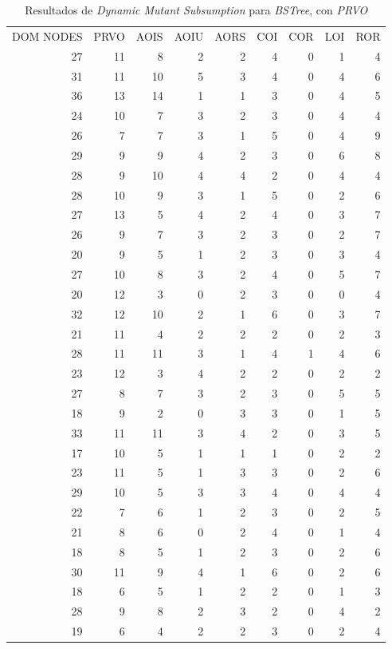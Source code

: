 \begin{table}[]
	\caption[\emph{Dynamic Mutant Subsumption} \emph{BSTree}, con \emph{PRVO}]{Resultados de \emph{Dynamic Mutant Subsumption} para \emph{BSTree}, con \emph{PRVO}}
	\label{tables.results.subsumption.bstree.prvo}
	\centering
	\scriptsize
	\def\arraystretch{0.95}
	\setlength\tabcolsep{0.5mm}
	\begin{tabular}{rrrrrrrrr}
		DOM NODES & PRVO & AOIS & AOIU & AORS & COI & COR & LOI & ROR \\
		27 & 11 & 8 & 2 & 2 & 4 & 0 & 1 & 4 \\
		31 & 11 & 10 & 5 & 3 & 4 & 0 & 4 & 6 \\
		36 & 13 & 14 & 1 & 1 & 3 & 0 & 4 & 5 \\
		24 & 10 & 7 & 3 & 2 & 3 & 0 & 4 & 4 \\
		26 & 7 & 7 & 3 & 1 & 5 & 0 & 4 & 9 \\
		29 & 9 & 9 & 4 & 2 & 3 & 0 & 6 & 8 \\
		28 & 9 & 10 & 4 & 4 & 2 & 0 & 4 & 4 \\
		28 & 10 & 9 & 3 & 1 & 5 & 0 & 2 & 6 \\
		27 & 13 & 5 & 4 & 2 & 4 & 0 & 3 & 7 \\
		26 & 9 & 7 & 3 & 2 & 3 & 0 & 2 & 7 \\
		20 & 9 & 5 & 1 & 2 & 3 & 0 & 3 & 4 \\
		27 & 10 & 8 & 3 & 2 & 4 & 0 & 5 & 7 \\
		20 & 12 & 3 & 0 & 2 & 3 & 0 & 0 & 4 \\
		32 & 12 & 10 & 2 & 1 & 6 & 0 & 3 & 7 \\
		21 & 11 & 4 & 2 & 2 & 2 & 0 & 2 & 3 \\
		28 & 11 & 11 & 3 & 1 & 4 & 1 & 4 & 6 \\
		23 & 12 & 3 & 4 & 2 & 2 & 0 & 2 & 2 \\
		27 & 8 & 7 & 3 & 2 & 3 & 0 & 5 & 5 \\
		18 & 9 & 2 & 0 & 3 & 3 & 0 & 1 & 5 \\
		33 & 11 & 11 & 3 & 4 & 2 & 0 & 3 & 5 \\
		17 & 10 & 5 & 1 & 1 & 1 & 0 & 2 & 2 \\
		23 & 11 & 5 & 1 & 3 & 3 & 0 & 2 & 6 \\
		29 & 10 & 5 & 3 & 3 & 4 & 0 & 4 & 4 \\
		22 & 7 & 6 & 1 & 2 & 3 & 0 & 2 & 5 \\
		21 & 8 & 6 & 0 & 2 & 4 & 0 & 1 & 4 \\
		18 & 8 & 5 & 1 & 2 & 3 & 0 & 2 & 6 \\
		30 & 11 & 9 & 4 & 1 & 6 & 0 & 2 & 6 \\
		18 & 6 & 5 & 1 & 2 & 2 & 0 & 1 & 3 \\
		28 & 9 & 8 & 2 & 3 & 2 & 0 & 4 & 2 \\
		19 & 6 & 4 & 2 & 2 & 3 & 0 & 2 & 4
	\end{tabular}
\end{table}

